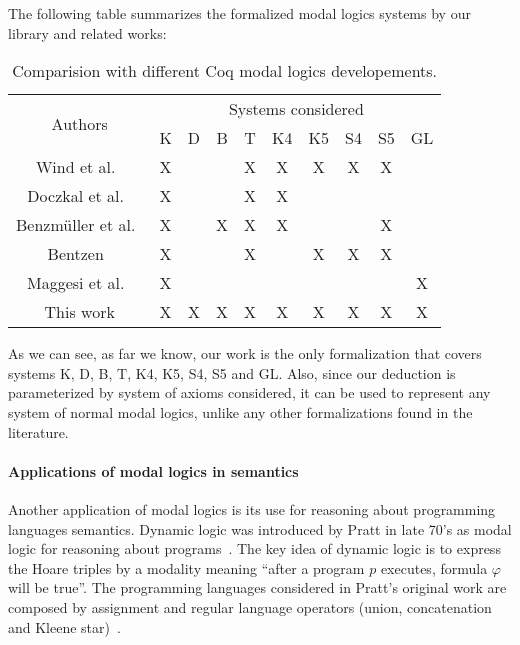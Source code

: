 \documentclass[sigconf]{acmart}
\begin{document}
The following table summarizes the formalized modal logics systems by our library
and related works:
\vspace{0.5cm} {
  \begin{table}[H]
    \begin{tabular}{|c|c|c|c|c|c|c|c|c|c|}
      \hline
      \multirow{2}{*}{Authors} & \multicolumn{9}{c|}{Systems considered} \\ \cline{2-10} 
                               & K & D & B & T & K4 & K5 & S4 & S5 & GL\\ \hline
      Wind et al.~\cite{dewind}     & X &   &   & X & X  & X  & X  &  X & \\ \hline
      Doczkal et al.~\cite{saarland}   & X &   &   & X & X  &    &    &  &  \\ \hline
      Benzmüller et al.~\cite{Chris_Bruno}& X &   & X & X &  X &    &    & X &  \\ \hline
      Bentzen~\cite{Bentzen2021} & X & & & X & & X & X & X & \\ \hline
      Maggesi et al.~\cite{Maggesi21} & X & & & & & & & & X \\ \hline
      This work         & X & X & X & X & X  &  X &  X & X  & X \\ \hline
    \end{tabular}
    \centering
    \caption{Comparision with different Coq modal logics developements.}
    \label{tab:comparacao_trabalhos_rel}
  \end{table}
}

As we can see, as far we know, our work is the only formalization that covers systems
K, D, B, T, K4, K5, S4, S5 and GL. Also, since our deduction is
parameterized by system of axioms considered, it can be used to represent any
system of normal modal logics, unlike any other formalizations found in the literature.

\paragraph{Applications of modal logics in semantics} Another application of
modal logics is its use for reasoning about programming languages semantics.
Dynamic logic was introduced by Pratt in late 70's as modal logic for reasoning
about programs~\cite{Pratt76,Pratt80}. The key idea of dynamic logic is to express the
Hoare triples by a modality meaning ``after a program $p$ executes, formula
$\varphi$ will be true''. The programming languages considered in Pratt's
original work are composed by assignment and regular language operators
(union, concatenation and Kleene star)~\cite{Pratt76}.
\end{document}
